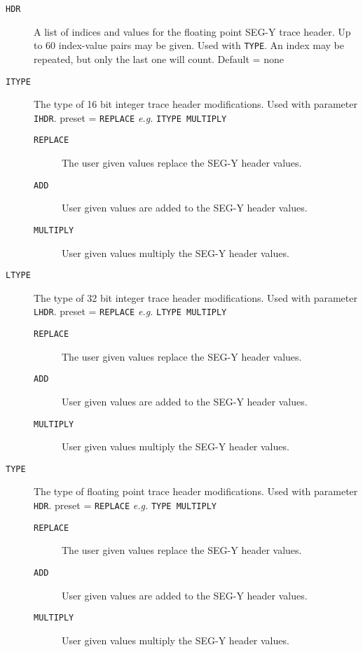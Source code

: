 \begin{description}
\item[\texttt{HDR}] A list of indices and values for the floating point SEG-Y trace
         header.  Up to 60 index-value pairs may be given.  Used with \texttt{TYPE}.
         An index may be repeated, but only the last one will count.
         Default = none

\item[\texttt{ITYPE}] The type of 16 bit integer trace header modifications.
         Used with parameter \texttt{IHDR}.
         \Gls{preset} = \texttt{REPLACE}      \textit{e.g.}  \texttt{ITYPE MULTIPLY}
\begin{description}
\item[\texttt{REPLACE}] The user given values replace the SEG-Y header values.
\item[\texttt{ADD}] User given values are added to the SEG-Y header values.
\item[\texttt{MULTIPLY}] User given values multiply the SEG-Y header values.
\end{description}

\item[\texttt{LTYPE}] The type of 32 bit integer trace header modifications.
         Used with parameter \texttt{LHDR}.
         \Gls{preset} = \texttt{REPLACE}      \textit{e.g.}  \texttt{LTYPE MULTIPLY}
\begin{description}
\item[\texttt{REPLACE}] The user given values replace the SEG-Y header values.
\item[\texttt{ADD}] User given values are added to the SEG-Y header values.
\item[\texttt{MULTIPLY}] User given values multiply the SEG-Y header values.
\end{description}

\item[\texttt{TYPE}] The type of floating point trace header modifications.
         Used with parameter \texttt{HDR}.
         \Gls{preset} = \texttt{REPLACE}      \textit{e.g.}  \texttt{TYPE MULTIPLY}
\begin{description}
\item[\texttt{REPLACE}] The user given values replace the SEG-Y header values.
\item[\texttt{ADD}] User given values are added to the SEG-Y header values.
\item[\texttt{MULTIPLY}] User given values multiply the SEG-Y header values.
\end{description}
\end{description}

